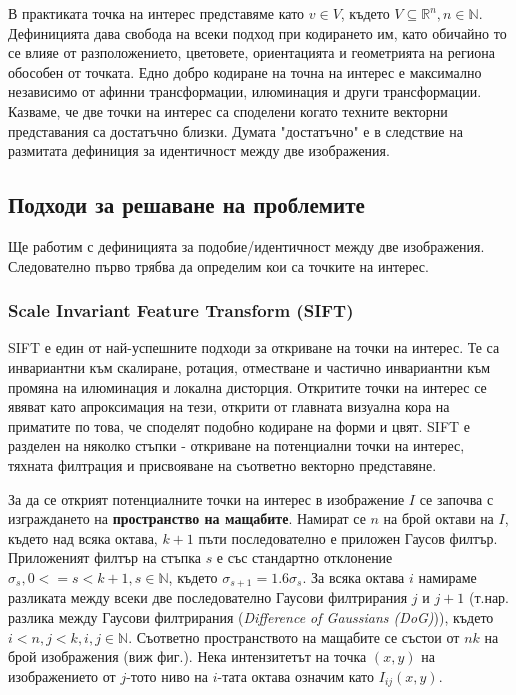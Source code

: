 \documentclass[a4paper,12pt]{article}
\begin{document}
\bigbreak

В практиката точка на интерес представяме като $v \in V$, където $V \subseteq \mathbb{R}^n, n \in \mathbb{N}$. Дефиницията дава свобода на всеки подход при кодирането им, като обичайно то се влияе от разположението, цветовете, ориентацията и геометрията на региона обособен от точката. Едно добро кодиране на точна на интерес е максимално независимо от афинни трансформации, илюминация и други трансформации. Казваме, че две точки на интерес са споделени когато техните векторни представания са достатъчно близки. Думата "достатъчно" е в следствие на размитата дефиниция за идентичност между две изображения.

\subsection{Подходи за решаване на проблемите}

Ще работим с дефиницията за подобие/идентичност между две изображения. Следователно първо трябва да определим кои са точките на интерес.

\subsubsection{Scale Invariant Feature Transform (SIFT)}

SIFT е един от най-успешните подходи за откриване на точки на интерес. Те са инвариантни към скалиране, ротация, отместване и частично инвариантни към промяна на илюминация и локална дисторция.  Откритите точки на интерес се явяват като апроксимация на тези, открити от главната визуална кора на приматите по това, че споделят подобно кодиране на форми и цвят. SIFT е разделен на няколко стъпки - откриване на потенциални точки на интерес, тяхната филтрация и присвояване на съответно векторно представяне.

\bigbreak

За да се открият потенциалните точки на интерес в изображение $I$ се започва с изграждането на \textbf{пространство на мащабите}. Намират се $n$ на брой октави на $I$, където над всяка октава, $k+1$ пъти последователно е приложен Гаусов филтър. Приложеният филтър на стъпка $s$ е със стандартно отклонение $\sigma_s, 0 <= s < k+1, s \in \mathbb{N}$, където $\sigma_{s+1} = 1.6 \sigma_s$. За всяка октава $i$ намираме разликата между всеки две последователно Гаусови филтрирания $j$ и $j+1$ (т.нар. разлика между Гаусови филтрирания (\textit{Difference of Gaussians (DoG)})), където $i < n, j < k, i, j \in \mathbb{N}$. Съответно пространството на мащабите се състои от $nk$ на брой изображения (виж фиг.). Нека интензитетът на точка $(x, y)$ на изображението от $j$-тото ниво на $i$-тата октава означим като $I_{ij}(x,y)$.
\end{document}
